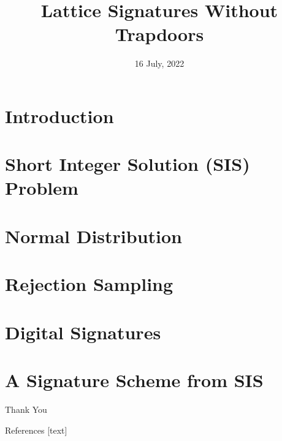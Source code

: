 \documentclass{beamer}
\title{Lattice Signatures Without Trapdoors}
\author{}
\date{16 July, 2022}
\begin{document}
	
	\begin{frame}
		\titlepage
	\end{frame}
	
	\begin{frame}{}
		\tableofcontents
		
	\end{frame}
	
	\section{Introduction} 
	
	\section{Short Integer Solution (SIS) Problem}
	
	\section{Normal Distribution}
	
	\section{Rejection Sampling}
	
	\section{Digital Signatures}
	
	\section{A Signature Scheme from SIS}
	
	
	\begin{frame}{}
		\begin{center}
			{\fontsize{20}{20}\selectfont Thank You}
		\end{center}
	\end{frame}

	\begin{frame}[allowframebreaks]{References}
		
		
		
	\end{frame}
	
\end{document}
